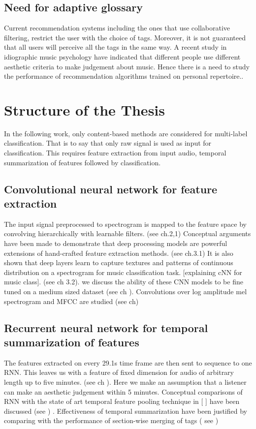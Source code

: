 \subsection{Need for adaptive glossary}
Current recommendation systems including the ones that use collaborative filtering, restrict the user with the choice of tags. Moreover, it is not guaranteed that all users will perceive all the tags in the same way. A recent study in idiographic music psychology have indicated that different people use different aesthetic criteria to make judgement about music\cite{NoAccountingForTaste}. Hence there is a need to study the performance of recommendation algorithms trained on personal repertoire..  




\section{Structure of the Thesis}
\label{structure}
In the following work, only content-based methods are considered for multi-label classification. That is to say that only raw signal is used as input for classification. This requires feature extraction from input audio, temporal summarization of features followed by classification. 

\subsection{Convolutional neural network for feature extraction}
The input signal preprocessed to spectrogram is mapped to the feature space by convolving hierarchically with learnable filters. (see ch.2,1) Conceptual arguments have been made to demonstrate that deep processing models are powerful extensions of hand-crafted feature extraction methods\cite{Yann}. (see ch.3.1) It is also shown that deep layers learn to capture textures and patterns of continuous distribution on a spectrogram for music classification task. [explaining cNN for music class]. (see ch 3.2).  we discuss the ability of these CNN models to be fine tuned on a medium sized dataset (see ch ). Convolutions over log amplitude mel spectrogram and MFCC are studied (see ch)



\subsection{ Recurrent neural network for temporal summarization of features}
 The features extracted on every 29.1s time frame are then sent to sequence to one RNN. This leaves us with a feature of fixed dimension for audio of arbitrary length up to five minutes. (see ch ). Here we make an assumption that a listener can make an aesthetic judgement within 5 minutes. Conceptual comparisons of RNN with the state of art temporal feature pooling technique in [ ] have been discussed (see ) . Effectiveness of temporal summarization have been justified by comparing with the performance of section-wise merging of tags ( see )

